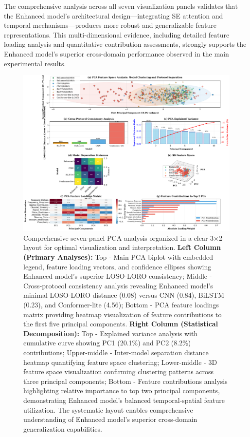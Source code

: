 \documentclass[journal]{IEEEtran}
\begin{document}
The comprehensive analysis across all seven visualization panels validates that the Enhanced model's architectural design—integrating SE attention and temporal mechanisms—produces more robust and generalizable feature representations. This multi-dimensional evidence, including detailed feature loading analysis and quantitative contribution assessments, strongly supports the Enhanced model's superior cross-domain performance observed in the main experimental results.

\begin{figure}[ht]
\centering
\includegraphics[width=\columnwidth]{figures/fig6_pca_analysis.pdf}
\caption{Comprehensive seven-panel PCA analysis organized in a clear 3×2 layout for optimal visualization and interpretation. \textbf{Left Column (Primary Analyses):} Top - Main PCA biplot with embedded legend, feature loading vectors, and confidence ellipses showing Enhanced model's superior LOSO-LORO consistency; Middle - Cross-protocol consistency analysis revealing Enhanced model's minimal LOSO-LORO distance (0.08) versus CNN (0.84), BiLSTM (0.23), and Conformer-lite (4.56); Bottom - PCA feature loadings matrix providing heatmap visualization of feature contributions to the first five principal components. \textbf{Right Column (Statistical Decomposition):} Top - Explained variance analysis with cumulative curve showing PC1 (20.1\%) and PC2 (8.2\%) contributions; Upper-middle - Inter-model separation distance heatmap quantifying feature space clustering; Lower-middle - 3D feature space visualization confirming clustering patterns across three principal components; Bottom - Feature contributions analysis highlighting relative importance to top two principal components, demonstrating Enhanced model's balanced temporal-spatial feature utilization. The systematic layout enables comprehensive understanding of Enhanced model's superior cross-domain generalization capabilities.}
\label{fig:pca_analysis}
\end{figure}
\end{document}
